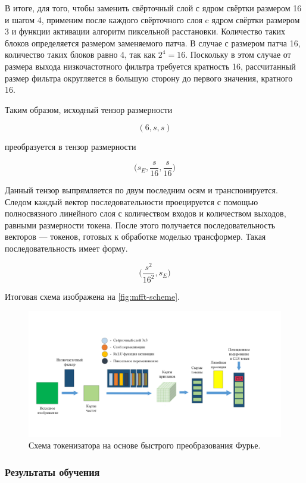 В итоге, для того, чтобы заменить свёрточный слой с ядром свёртки размером 16 и шагом 4, применим после каждого свёрточного слоя c ядром свёртки размером 3 и функции активации алгоритм пиксельной расстановки. Количество таких блоков определяется размером заменяемого патча. В случае с размером патча 16, количество таких блоков равно 4, так как $2^4 = 16$. Поскольку в этом случае от размера выхода низкочастотного фильтра требуется кратность 16, рассчитанный размер фильтра округляется в большую сторону до первого значения, кратного 16.


Таким образом, исходный тензор размерности

$$
(6, s, s)
$$

преобразуется в тензор размерности

$$
\Big(s_E, \dfrac{s}{16}, \dfrac{s}{16}\Big)
$$

Данный тензор выпрямляется по двум последним осям и транспонируется. Следом каждый вектор последовательности проецируется с помощью полносвязного линейного слоя с количеством входов и количеством выходов, равными размерности токена. После этого получается последовательность векторов --- токенов, готовых к обработке моделью трансформер. Такая последовательность имеет форму.

$$
\Big(\dfrac{s^2}{16^2}, s_E\Big)
$$


Итоговая схема изображена на \autoref{fig:mfft-scheme}.

\begin{figure}[H]
    \centering
    \includegraphics[width=1.0\textwidth]
    {images/research/fourier/mfft_scheme.png}
    \caption{Схема токенизатора на основе быстрого преобразования Фурье.}
    \label{fig:mfft-scheme}
\end{figure}

\subsubsection{Результаты обучения}

